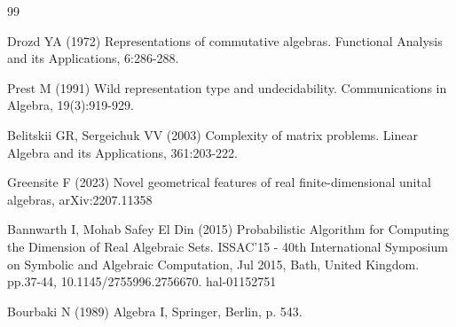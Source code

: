 \documentclass{amsart}
\numberwithin{equation}{section}
\theoremstyle{definition}
\numberwithin{theorem}{section}
\begin{document}
   \begin{thebibliography}{99}
   
     Drozd YA (1972) Representations of commutative algebras. Functional Analysis and its Applications, 6:286-288.
   
        Prest M (1991) Wild representation type and undecidability.  Communications in Algebra, 19(3):919-929.
       
        Belitskii GR, Sergeichuk VV (2003) Complexity of matrix problems.  Linear Algebra and its Applications, 361:203-222.
       
         Greensite F (2023) Novel geometrical features of real finite-dimensional unital algebras, arXiv:2207.11358
               
     Bannwarth I, Mohab Safey El Din (2015) Probabilistic Algorithm for Computing the Dimension of Real Algebraic Sets. ISSAC’15 - 40th International Symposium on Symbolic and Algebraic Computation, Jul 2015, Bath, United Kingdom. pp.37-44, 10.1145/2755996.2756670. hal-01152751
 
   Bourbaki N (1989) Algebra I, Springer, Berlin, p. 543.

       
      \end{thebibliography}
   
   
\end{document}
